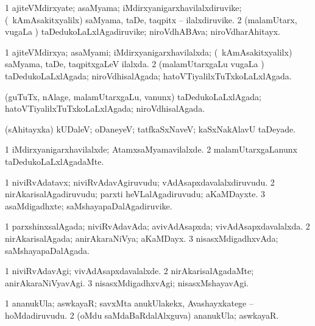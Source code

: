 \bentry
{}
\gl{\nA}
\bmng
\bnum
\num{1} ajiteVMdirxyate; asaMyama; iMdirxyanigarxhavilalxdiruvike; (\kanmu\ kAmAsakitxyalilx) saMyama, taDe, taqpitx -- ilalxdiruvike. 
\num{2} (malamUtarx, \mo vugaLa \vi) taDedukoLaLxlAgadiruvike; niroVdhABAva; niroVdharAhitayx. 
\enum
\emng
\eentry

\bentry
{}
\gl{\gu}
\bmng
\bnum
\num{1} ajiteVMdirxya; asaMyami; iMdirxyanigarxhavilalxda; (\kanmu\ kAmAsakitxyalilx) saMyama, taDe, taqpitxgaLeV ilalxda. 
\num{2} (malamUtarxgaLu \mo vugaLa \vi) taDedukoLaLxlAgada; niroVdhisalAgada; hatoVTiyalilxTuTxkoLaLxlAgada. 
\enum
\emng

\noindent
\gl{\pagu}
\bmng
{} (guTuTx, nAlage, malamUtarxgaLu, \mo vanunx) taDedukoLaLxlAgada; hatoVTiyalilxTuTxkoLaLxlAgada; niroVdhisalAgada. 
\emng
\eentry

\bentry
{}
\gl{\kirxvi}
\bmng
(sAhitayxka) kUDaleV; oDaneyeV; tatfkaSxNaveV; kaSxNakAlavU taDeyade. 
\emng
\eentry

\bentry
{}
\gl{\kirxvi}
\bmng
\bnum
\num{1} iMdirxyanigarxhavilalxde; AtamxsaMyamavilalxde. 
\num{2} malamUtarxgaLanunx taDedukoLaLxlAgadaMte. 
\enum
\emng
\eentry

\bentry
{}
\gl{\nA}
\bmng
\bnum
\num{1} niviRvAdatavx; niviRvAdavAgiruvudu; vAdAsapxdavalalxdiruvudu. 
\num{2} nirAkarisalAgadiruvudu; parxti heVLalAgadiruvudu; aKaMDayxte. 
\num{3} asaMdigadhxte; saMshayapaDalAgadiruvike. 
\enum
\emng
\eentry

\bentry
{}
\gl{\gu}
\bmng
\bnum
\num{1} parxshinxsalAgada; niviRvAdavAda; avivAdAsapxda; vivAdAsapxdavalalxda. 
\num{2} nirAkarisalAgada; anirAkaraNiVya; aKaMDayx. 
\num{3} nisasxMdigadhxvAda; saMshayapaDalAgada. 
\enum
\emng
\eentry

\bentry
{}
\gl{\kirxvi}
\bmng
\bnum
\num{1} niviRvAdavAgi; vivAdAsapxdavalalxde. 
\num{2} nirAkarisalAgadaMte; anirAkaraNiVyavAgi. 
\num{3} nisasxMdigadhxvAgi; nisasxMshayavAgi. 
\enum
\emng
\eentry

\bentry
{}
\gl{\nA}
\bmng
\bnum
\num{1} ananukUla; aswkayaR; savxMta anukUlakekx, Avashayxkatege -- hoMdadiruvudu. 
\num{2} (oMdu saMdaBaRdalAlxguva) ananukUla; aswkayaR. 
\enum
\emng
\eentry

